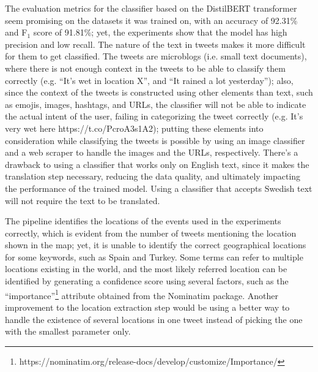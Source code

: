The evaluation metrics for the classifier based on the DistilBERT transformer seem promising on the
datasets it was trained on, with an accuracy of 92.31\% and F$_{1}$ score of 91.81\%; yet, the
experiments show that the model has high precision and low recall. The nature of the text in tweets
makes it more difficult for them to get classified. The tweets are
microblogs (i.e. small text documents), where there is not enough context in the tweets to be able
to classify them correctly (e.g. ``It's wet in location X'', and ``It rained a lot yesterday'');
also, since the context of the tweets is constructed using other elements than text, such as emojis,
images, hashtags, and \ac{URL}s, the classifier will not be able to indicate the actual intent of
the user, failing in categorizing the tweet correctly (e.g. It's very wet here
https://t.co/PcroA3s1A2); putting these elements into consideration while classifying the tweets is
possible by using an image classifier and a web scraper to handle the images and the \ac{URL}s,
respectively. There's a drawback to using a classifier that works only on English text, since it
makes the translation step necessary, reducing the data quality, and ultimately impacting
the performance of the trained model. Using a classifier that accepts Swedish text will not require
the text to be translated.

The pipeline identifies the locations of the events used in the experiments correctly, which is
evident from the number of tweets mentioning the location shown in the map; yet, it is unable to
identify the correct geographical locations for some keywords, such as Spain and Turkey. Some terms
can refer to multiple locations existing in the world, and the most likely referred location can be
identified by generating a confidence score using several factors, such as the
``importance''\footnote{https://nominatim.org/release-docs/develop/customize/Importance/} attribute
obtained from the Nominatim package. Another improvement to the location extraction step would be
using a better way to handle the existence of several locations in one tweet instead of picking the
one with the smallest parameter only.

